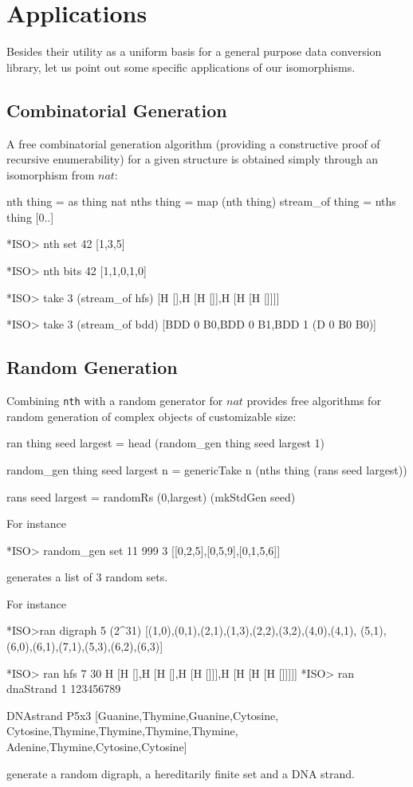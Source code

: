\documentclass[]{INCLUDES/llncs}
\begin{document}
\section{Applications}
Besides their utility as a uniform basis for a general purpose
data conversion library, let us point out
some specific applications of our isomorphisms.

\subsection{Combinatorial Generation}
A free combinatorial generation algorithm (providing
a constructive proof of recursive enumerability)
for a given structure is obtained simply through
an isomorphism from $nat$:
\begin{code}
nth thing = as thing nat
nths thing = map (nth thing)
stream_of thing = nths thing [0..]
\end{code}
\begin{codex}
*ISO> nth set 42
[1,3,5]

*ISO> nth bits 42
[1,1,0,1,0]

*ISO> take 3 (stream_of hfs)
[H [],H [H []],H [H [H []]]]

*ISO> take 3 (stream_of bdd)
[BDD 0 B0,BDD 0 B1,BDD 1 (D 0 B0 B0)]
\end{codex}

\subsection{Random Generation}
Combining {\tt nth} with a random generator for $nat$
provides free algorithms for random generation of
complex objects of customizable size:
\begin{code}
ran thing seed largest = head (random_gen thing seed largest 1)

random_gen thing seed largest n = genericTake n
  (nths thing (rans seed largest))
  
rans seed largest = 
    randomRs (0,largest) (mkStdGen seed)
\end{code}
For instance
\begin{codex}
*ISO> random_gen set 11 999 3
[[0,2,5],[0,5,9],[0,1,5,6]]
\end{codex}
generates a list of 3 random sets.

For instance
\begin{codex}
*ISO>ran digraph 5 (2^31)
[(1,0),(0,1),(2,1),(1,3),(2,2),(3,2),(4,0),(4,1),
 (5,1),(6,0),(6,1),(7,1),(5,3),(6,2),(6,3)]
 
*ISO> ran hfs 7 30
H [H [],H [H [],H [H []]],H [H [H [H []]]]]
*ISO> ran dnaStrand 1 123456789

DNAstrand P5x3 [Guanine,Thymine,Guanine,Cytosine,
  Cytosine,Thymine,Thymine,Thymine,Thymine,
  Adenine,Thymine,Cytosine,Cytosine]
\end{codex}
generate a random digraph, a hereditarily finite set and a DNA strand.
\end{document}
